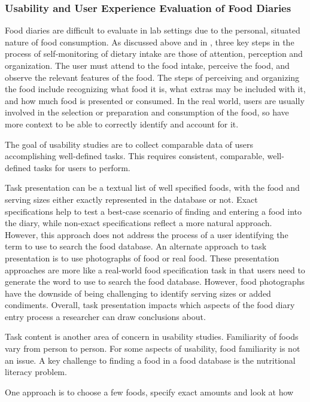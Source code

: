 \subsubsection{Usability and User Experience Evaluation of Food Diaries}


Food diaries are difficult to evaluate in lab settings due to the personal, situated nature of food consumption. As discussed above and in \citep{Baranowski1994}, three key steps in the process of self-monitoring of dietary intake are those of attention, perception and organization. The user must attend to the food intake, perceive the food, and observe the relevant features of the food. The steps of perceiving and organizing the food include recognizing what food it is, what extras may be included with it, and how much food is presented or consumed. In the real world, users are usually involved in the selection or preparation and consumption of the food, so have more context to be able to correctly identify and account for it. 

The goal of usability studies are to collect comparable data of users accomplishing well-defined tasks. This requires consistent, comparable, well-defined tasks for users to perform.  

Task presentation can be a textual list of well specified foods, with the food and serving sizes either exactly represented in the database or not. Exact specifications help to test a best-case scenario of finding and entering a food into the diary, while non-exact specifications reflect a more natural approach. However, this approach does not address the process of a user identifying the term to use to search the food database. An alternate approach to task presentation is to use photographs of food or real food. These presentation approaches are more like a real-world food specification task in that users need to generate the word to use to search the food database. However, food photographs have the downside of being challenging to identify serving sizes or added condiments. Overall, task presentation impacts which aspects of the food diary entry process a researcher can draw conclusions about. 

Task content is another area of concern in usability studies. Familiarity of foods vary from person to person. For some aspects of usability, food familiarity is not an issue.    A key challenge to finding a food in a food database is the nutritional literacy problem. 

One approach is to choose a few foods, specify exact amounts and look at how 

